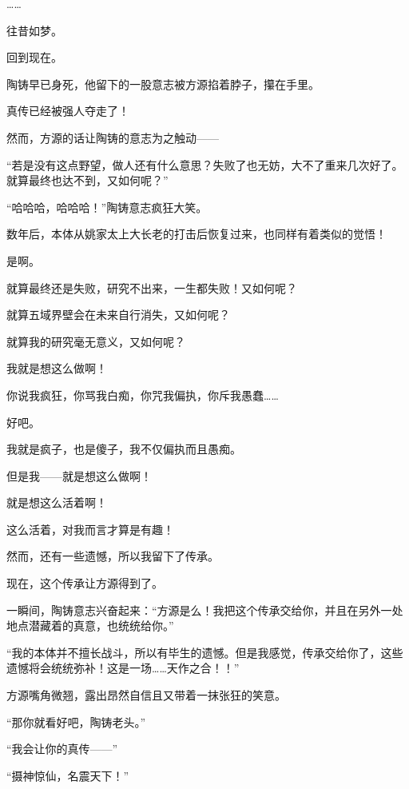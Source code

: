 \begin{this_body}
……

往昔如梦。

回到现在。

陶铸早已身死，他留下的一股意志被方源掐着脖子，攥在手里。

真传已经被强人夺走了！

然而，方源的话让陶铸的意志为之触动——

“若是没有这点野望，做人还有什么意思？失败了也无妨，大不了重来几次好了。就算最终也达不到，又如何呢？”

“哈哈哈，哈哈哈！”陶铸意志疯狂大笑。

数年后，本体从姚家太上大长老的打击后恢复过来，也同样有着类似的觉悟！

是啊。

就算最终还是失败，研究不出来，一生都失败！又如何呢？

就算五域界壁会在未来自行消失，又如何呢？

就算我的研究毫无意义，又如何呢？

我就是想这么做啊！

你说我疯狂，你骂我白痴，你咒我偏执，你斥我愚蠢……

好吧。

我就是疯子，也是傻子，我不仅偏执而且愚痴。

但是我——就是想这么做啊！

就是想这么活着啊！

这么活着，对我而言才算是有趣！

然而，还有一些遗憾，所以我留下了传承。

现在，这个传承让方源得到了。

一瞬间，陶铸意志兴奋起来：“方源是么！我把这个传承交给你，并且在另外一处地点潜藏着的真意，也统统给你。”

“我的本体并不擅长战斗，所以有毕生的遗憾。但是我感觉，传承交给你了，这些遗憾将会统统弥补！这是一场……天作之合！！”

方源嘴角微翘，露出昂然自信且又带着一抹张狂的笑意。

“那你就看好吧，陶铸老头。”

“我会让你的真传——”

“摄神惊仙，名震天下！”

\end{this_body}

